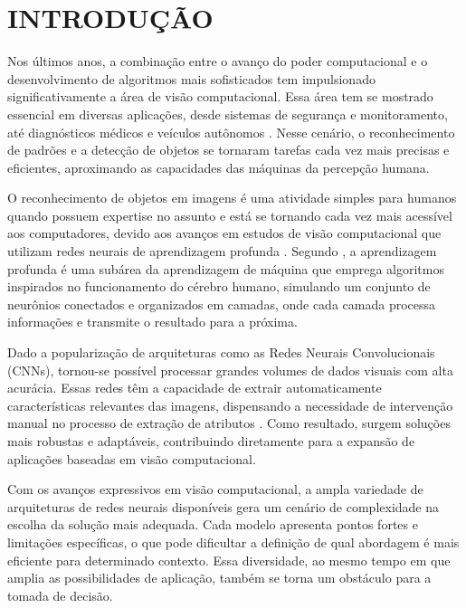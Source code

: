 \chapter{INTRODUÇÃO}
\label{cap:introducao}

Nos últimos anos, a combinação entre o avanço do poder computacional e o desenvolvimento de
algoritmos mais sofisticados tem impulsionado significativamente a área de visão computacional.
Essa área tem se mostrado essencial em diversas aplicações, desde
sistemas de segurança e monitoramento, até diagnósticos médicos e veículos autônomos
\cite{szeliski2022computer}. Nesse cenário, o reconhecimento de padrões e a detecção de objetos
se tornaram tarefas cada vez mais precisas e eficientes, aproximando as capacidades das máquinas
da percepção humana.

O reconhecimento de objetos em imagens é uma atividade simples para humanos quando possuem
expertise no assunto e está se tornando cada vez mais acessível aos computadores, devido aos
avanços em estudos de visão computacional que utilizam redes neurais de aprendizagem profunda
\cite{goodfellow2016deep}. Segundo , a aprendizagem profunda
é uma subárea da aprendizagem de máquina que emprega algoritmos inspirados no funcionamento
do cérebro humano, simulando um conjunto de neurônios conectados e organizados em camadas,
onde cada camada processa informações e transmite o resultado para a próxima.

Dado a popularização de arquiteturas como as Redes Neurais Convolucionais (CNNs), tornou-se
possível processar grandes volumes de dados visuais com alta acurácia. Essas redes têm a
capacidade de extrair automaticamente características relevantes das imagens, dispensando a
necessidade de intervenção manual no processo de extração de atributos \cite{lecun2015deep}.
Como resultado, surgem soluções mais robustas e adaptáveis, contribuindo diretamente para a
expansão de aplicações baseadas em visão computacional.

Com os avanços expressivos em visão computacional, a ampla variedade de arquiteturas de redes
neurais disponíveis gera um cenário de complexidade na escolha da solução mais adequada. Cada
modelo apresenta pontos fortes e limitações específicas, o que pode dificultar a definição de
qual abordagem é mais eficiente para determinado contexto. Essa diversidade, ao mesmo tempo em
que amplia as possibilidades de aplicação, também se torna um obstáculo para a tomada de
decisão.

